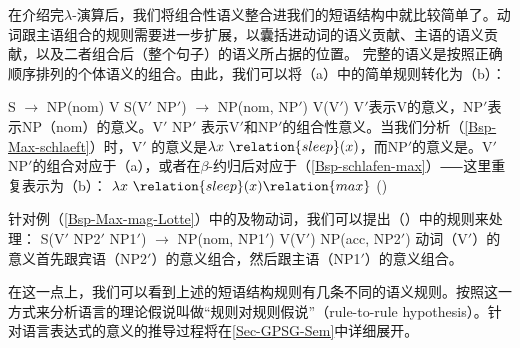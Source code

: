 \begin{sloppypar}
\noindent
在介绍完$\lambda$-演算后，我们将组合性语义整合进我们的短语结构中就比较简单了。动词跟主语组合的规则需要进一步扩展，以囊括进动词的语义贡献、主语的语义贡献，以及二者组合后（整个句子）的语义所占据的位置。
  完整的语义是按照正确顺序排列的个体语义的组合。由此，我们可以将（a）中的简单规则转化为（b）：
\end{sloppypar}
\eal
\ex S $\to$ NP(nom) V
\ex S(V$'$ NP$'$) $\to$ NP(nom, NP$'$) V(V$'$)
\zl
V$'$表示V的意义，NP$'$表示NP（nom）的意义。V$'$ NP$'$ 表示V$'$和NP$'$的组合性意义。当我们分析（\ref{Bsp-Max-schlaeft}）时，V$'$ 的意义是$\lambda x~\relation{sleep}(x)$，而NP$'$的意义是。V$'$ NP$'$的组合对应于（a），或者在$\beta$-约归后对应于（\ref{Bsp-schlafen-max}）⸺这里重复表示为（b）：
\eal
\ex $\lambda x~\relation{sleep}(x) \relation{max}$
\ex {}()
\zl

\noindent
针对例（\ref{Bsp-Max-mag-Lotte}）中的及物动词，我们可以提出（）中的规则来处理：
\ea
S(V$'$ NP2$'$ NP1$'$) $\to$ NP(nom, NP1$'$) V(V$'$) NP(acc, NP2$'$)
\z
动词（V$'$）的意义首先跟宾语（NP2$'$）的意义组合，然后跟主语（NP1$'$）的意义组合。

在这一点上，我们可以看到上述的短语结构规则有几条不同的语义规则。按照这一方式来分析语言的理论假说叫做“规则对规则假说”（rule-to-rule hypothesis）\citep[]{Bach76a}。针对语言表达式的意义的推导过程将在\ref{Sec-GPSG-Sem}中详细展开。

